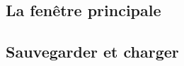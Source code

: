 \documentclass[12pt]{article}
\begin{document}
\subsection{La fenêtre principale}	\label{sec:fen_princ}			
\subsection{Sauvegarder et charger}	\label{sec:sauvegarde_chargement}	
\clearpage

\end{document}
